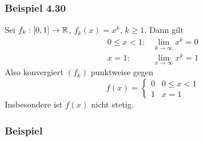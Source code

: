 \subsubsection*{Beispiel 4.30}
Sei $f_k:\lbrack 0,1\rbrack\to\mathbb{R}$, $f_k(x)=x^k$, $k\geq 1$. Dann gilt 
\begin{align*}
0 \le x < 1:&\mathop {\lim }\limits_{k \to \infty } {x^k} = 0\\
x = 1:&\mathop {\lim }\limits_{x \to \infty } {x^k} = 1
\end{align*}
Also konvergiert $\left( f_k\right)$ punktweise gegen 
\[f(x) = \left\{ {\begin{array}{*{20}{r}}
0&{0 \le x < 1}\\
1&{x = 1}
\end{array}} \right.\]
Insbesondere ist $f\left( x\right)$ nicht stetig.

\subsubsection*{Beispiel}
